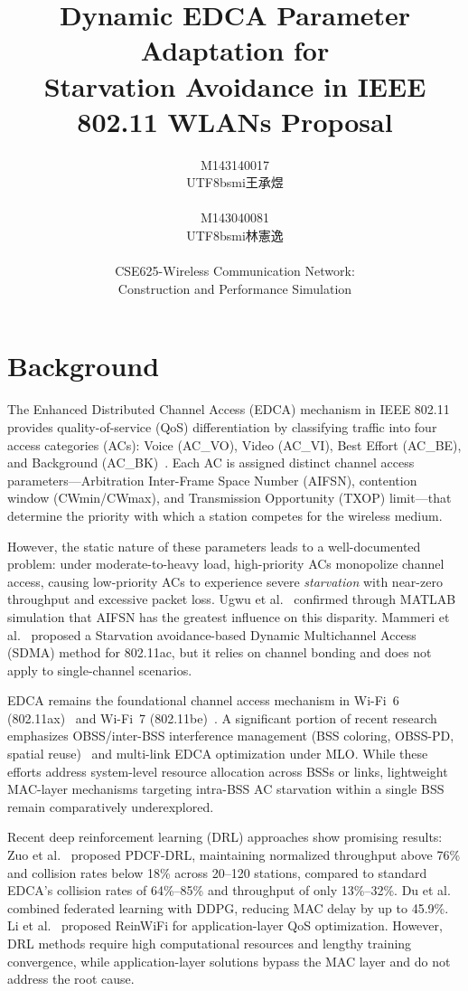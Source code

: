 \documentclass[12pt]{article}
\title{\textbf{Dynamic EDCA Parameter Adaptation for\\
Starvation Avoidance in IEEE 802.11 WLANs Proposal}}
\author{
  M143140017 \begin{CJK}{UTF8}{bsmi}王承煜\end{CJK}\\
  M143040081 \begin{CJK}{UTF8}{bsmi}林憲逸\end{CJK}\\[1em]
  CSE625-Wireless Communication Network:\\
  Construction and Performance Simulation\\
  }
\date{}
\begin{document}
\maketitle

\section{Background}

The Enhanced Distributed Channel Access (EDCA) mechanism in
IEEE 802.11 provides quality-of-service (QoS) differentiation
by classifying traffic into four access categories (ACs): Voice
(AC\_VO), Video (AC\_VI), Best Effort (AC\_BE), and Background
(AC\_BK)~\cite{ieee80211}. Each AC is assigned distinct channel
access parameters---Arbitration Inter-Frame Space Number (AIFSN),
contention window (CWmin/CWmax), and Transmission Opportunity
(TXOP) limit---that determine the priority with which a station
competes for the wireless medium.

However, the static nature of these parameters leads to a
well-documented problem: under moderate-to-heavy load,
high-priority ACs monopolize channel access, causing low-priority
ACs to experience severe \emph{starvation} with near-zero
throughput and excessive packet loss. Ugwu et
al.~\cite{ugwu2022} confirmed through MATLAB simulation that
AIFSN has the greatest influence on this disparity. Mammeri et
al.~\cite{mammeri2021} proposed a Starvation avoidance-based
Dynamic Multichannel Access (SDMA) method for 802.11ac, but it
relies on channel bonding and does not apply to single-channel
scenarios.

EDCA remains the foundational channel access mechanism in
Wi-Fi~6 (802.11ax)~\cite{ieee80211ax} and Wi-Fi~7
(802.11be)~\cite{yi2025}. A significant portion of recent
research emphasizes OBSS/inter-BSS interference management
(BSS coloring, OBSS-PD, spatial
reuse)~\cite{tuan2023} and multi-link EDCA optimization under
MLO. While these efforts address system-level resource
allocation across BSSs or links, lightweight MAC-layer
mechanisms targeting intra-BSS AC starvation within a single
BSS remain comparatively underexplored.

Recent deep reinforcement learning (DRL) approaches show
promising results: Zuo et al.~\cite{zuo2025} proposed PDCF-DRL,
maintaining normalized throughput above 76\% and collision rates
below 18\% across 20--120 stations, compared to standard EDCA's
collision rates of 64\%--85\% and throughput of only 13\%--32\%.
Du et al.~\cite{du2024} combined federated learning with DDPG,
reducing MAC delay by up to 45.9\%. Li et al.~\cite{li2024}
proposed ReinWiFi for application-layer QoS optimization.
However, DRL methods require high computational resources and
lengthy training convergence, while application-layer solutions
bypass the MAC layer and do not address the root cause.
\end{document}
